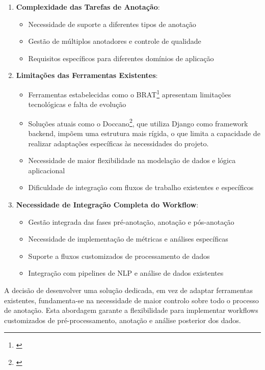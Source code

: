 \begin{enumerate}
    \item \textbf{Complexidade das Tarefas de Anotação}:
    \begin{itemize}
        \item Necessidade de suporte a diferentes tipos de anotação
        \item Gestão de múltiplos anotadores e controle de qualidade
        \item Requisitos específicos para diferentes domínios de aplicação
    \end{itemize}

    \item \textbf{Limitações das Ferramentas Existentes}:
    \begin{itemize}
        \item Ferramentas estabelecidas como o BRAT\footnote{\cite{brat-repo,brat-about}} apresentam limitações tecnológicas e falta de evolução
        \item Soluções atuais como o Doccano\footnote{\cite{doccano-repo,doccano-docs}}, que utiliza Django como framework backend, impõem uma estrutura mais rígida, o que limita a capacidade de realizar adaptações específicas às necessidades do projeto.
        \item Necessidade de maior flexibilidade na modelação de dados e lógica aplicacional
        \item Dificuldade de integração com fluxos de trabalho existentes e específicos
    \end{itemize}

    \item \textbf{Necessidade de Integração Completa do Workflow}:
    \begin{itemize}
        \item Gestão integrada das fases pré-anotação, anotação e pós-anotação
        \item Necessidade de implementação de métricas e análises específicas
        \item Suporte a fluxos customizados de processamento de dados
        \item Integração com pipelines de NLP e análise de dados existentes
    \end{itemize}
\end{enumerate}

A decisão de desenvolver uma solução dedicada, em vez de adaptar ferramentas existentes, fundamenta-se na necessidade de maior controlo sobre todo o processo de anotação. Esta abordagem garante a flexibilidade para implementar workflows customizados de pré-processamento, anotação e análise posterior dos dados. 

